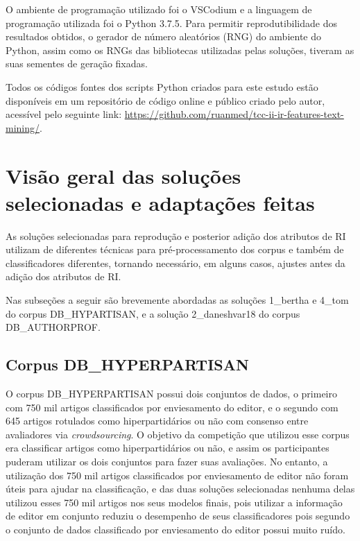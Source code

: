 		O ambiente de programação utilizado foi o VSCodium e a linguagem de programação utilizada foi o Python 3.7.5.
		Para permitir reprodutibilidade dos resultados obtidos, o gerador de número aleatórios (RNG) do ambiente do Python, assim como os RNGs das bibliotecas utilizadas pelas soluções, tiveram as suas sementes de geração fixadas.

		Todos os códigos fontes dos scripts Python criados para este estudo estão disponíveis em um repositório de código online e público criado pelo autor, acessível pelo seguinte link: \hyperlink{https://github.com/ruanmed/tcc-ii-ir-features-text-mining/}{https://github.com/ruanmed/tcc-ii-ir-features-text-mining/}.

	\section{Visão geral das soluções selecionadas e adaptações feitas} \label{sec:VisãoSoluçõesEAdaptações}
		As soluções selecionadas para reprodução e posterior adição dos atributos de RI utilizam de diferentes técnicas para pré-processamento dos corpus e também de classificadores diferentes, tornando necessário, em alguns casos, ajustes antes da adição dos atributos de RI.

		Nas subseções a seguir são brevemente abordadas as soluções 1\_bertha e 4\_tom do corpus DB\_HYPARTISAN, e a solução 2\_daneshvar18 do corpus DB\_AUTHORPROF.

		\subsection{Corpus DB\_HYPERPARTISAN}
			O corpus DB\_HYPERPARTISAN possui dois conjuntos de dados, o primeiro com 750 mil artigos classificados por enviesamento do editor, e o segundo com 645 artigos rotulados como hiperpartidários ou não com consenso entre avaliadores via \textit{crowdsourcing}.
			O objetivo da competição que utilizou esse corpus era classificar artigos como hiperpartidários ou não, e assim os participantes puderam utilizar os dois conjuntos para fazer suas avaliações. 
			No entanto, a utilização dos 750 mil artigos classificados por enviesamento de editor não foram úteis para ajudar na classificação, e das duas soluções selecionadas nenhuma delas utilizou esses 750 mil artigos nos seus modelos finais, pois utilizar a informação de editor em conjunto reduziu o desempenho de seus classificadores \cite[p.~840]{jiang-etal-2019-team} pois segundo  o conjunto de dados classificado por enviesamento do editor possui muito ruído.

